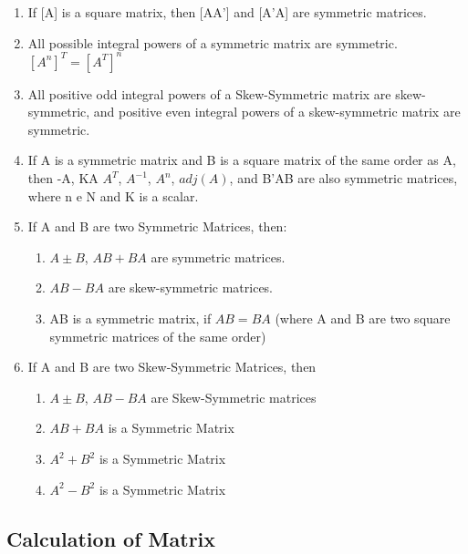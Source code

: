 \begin{enumerate}
    \item If [A] is a square matrix, then [AA'] and [A'A] are symmetric matrices.

    \item All possible integral powers of a symmetric matrix are symmetric. $[A^n]^T = [A^T]^n$

    \item All positive odd integral powers of a Skew-Symmetric matrix are skew-symmetric, and positive even integral powers of a skew-symmetric matrix are symmetric.

    \item If A is a symmetric matrix and B is a square matrix of the same order as A, then -A, KA $A^T$, $A^{-1}$, $A^n$, $adj(A)$, and B'AB are also symmetric matrices, where n e N and K is a scalar.

    \item If A and B are two Symmetric Matrices, then:
    \begin{enumerate}
        \item $A \pm B$, $AB + BA$ are symmetric matrices.

        \item $AB - BA$ are skew-symmetric matrices.

        \item AB is a symmetric matrix, if $AB = BA$ (where A and B are two square symmetric matrices of the same order)
    \end{enumerate}

    \item If A and B are two Skew-Symmetric Matrices, then
    \begin{enumerate}
        \item $A \pm B$, $AB - BA$ are Skew-Symmetric matrices

        \item $AB + BA$ is a Symmetric Matrix

        \item $A^2 + B^2$ is a Symmetric Matrix

        \item $A^2 - B^2$ is a Symmetric Matrix
    \end{enumerate}
\end{enumerate}

\subsection{Calculation of Matrix}

